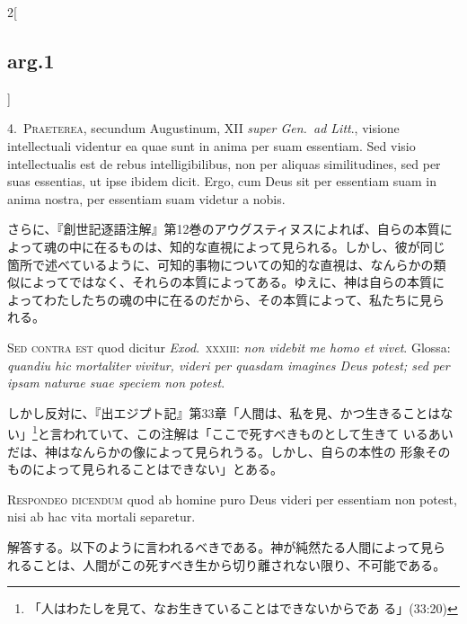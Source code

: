 \documentclass[paper=a4paper,fontsize=10pt,jafontsize=9pt,titlepage]{jlreq}
\begin{document}
\begin{paracol}{2}[\subsection{arg.1}]

4.~{\scshape Praeterea}, secundum Augustinum, XII {\itshape super Gen.~ad
Litt}., visione intellectuali videntur ea quae sunt in anima per suam
essentiam. Sed visio intellectualis est de rebus intelligibilibus, non
per aliquas similitudines, sed per suas essentias, ut ipse ibidem
dicit. Ergo, cum Deus sit per essentiam suam in anima nostra, per
essentiam suam videtur a nobis.

\switchcolumn

さらに、『創世記逐語注解』第12巻のアウグスティヌスによれば、自らの本質に
よって魂の中に在るものは、知的な直視によって見られる。しかし、彼が同じ
箇所で述べているように、可知的事物についての知的な直視は、なんらかの類
似によってではなく、それらの本質によってある。ゆえに、神は自らの本質に
よってわたしたちの魂の中に在るのだから、その本質によって、私たちに見ら
れる。

\switchcolumn*[\subsection{s.c.}]

{\scshape Sed contra est} quod dicitur {\itshape Exod}.~{\scshape xxxiii}: {\itshape non
videbit me homo et vivet}. Glossa: {\itshape quandiu hic mortaliter
vivitur, videri per quasdam imagines Deus potest; sed per ipsam
naturae suae speciem non potest}.

\switchcolumn

しかし反対に、『出エジプト記』第33章「人間は、私を見、かつ生きることはな
い」\footnote{「人はわたしを見て、なお生きていることはできないからであ
る」(33:20)}と言われていて、この注解は「ここで死すべきものとして生きて
いるあいだは、神はなんらかの像によって見られうる。しかし、自らの本性の
形象そのものによって見られることはできない」とある。


{\scshape Respondeo dicendum} quod ab homine puro Deus videri per essentiam
non potest, nisi ab hac vita mortali separetur.

\switchcolumn

解答する。以下のように言われるべきである。神が純然たる人間によって見ら
れることは、人間がこの死すべき生から切り離されない限り、不可能である。


\end{paracol}
\end{document}
